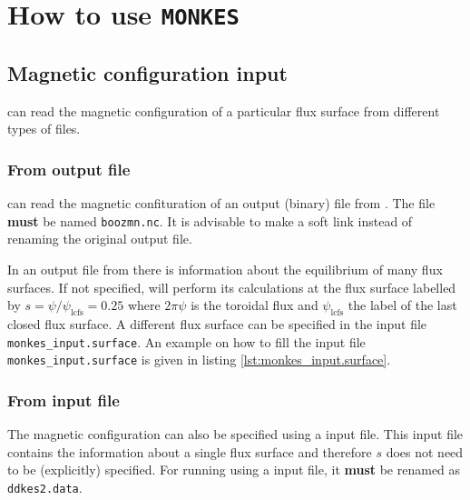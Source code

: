 \section{How to use \texttt{MONKES}}


\subsection{Magnetic configuration input}\label{sec:Magnetic_configuration_input}


{\MONKES} can read the magnetic configuration of a particular flux surface from different types of files.
\subsubsection{From {\BOOZERXFORM} output file}
{\MONKES} can read the magnetic confituration of an output (binary) file from {\BOOZERXFORM}. The file \textbf{must} be named \texttt{boozmn.nc}. It is advisable to make a soft link instead of renaming the original {\BOOZERXFORM} output file. 

In an output file from {\BOOZERXFORM} there is information about the equilibrium of many flux surfaces. If not specified, {\MONKES} will perform its calculations at the flux surface labelled by $s={\psi/\psi_{\text{lcfs}}}=0.25$ where $2\pi\psi$ is the toroidal flux and $\psi_{\text{lcfs}}$ the label of the last closed flux surface. A different flux surface can be specified in the input file \texttt{monkes\_input.surface}. An example on how to fill the input file \texttt{monkes\_input.surface} is given in listing \ref{lst:monkes_input.surface}. 



\subsubsection{From {\DKES} input file}
The magnetic configuration can also be specified using a {\DKES} input file. This input file contains the information about a single flux surface and therefore $s$ does not need to be (explicitly) specified. For running {\MONKES} using a {\DKES} input file, it \textbf{must} be renamed as \texttt{ddkes2.data}. 


